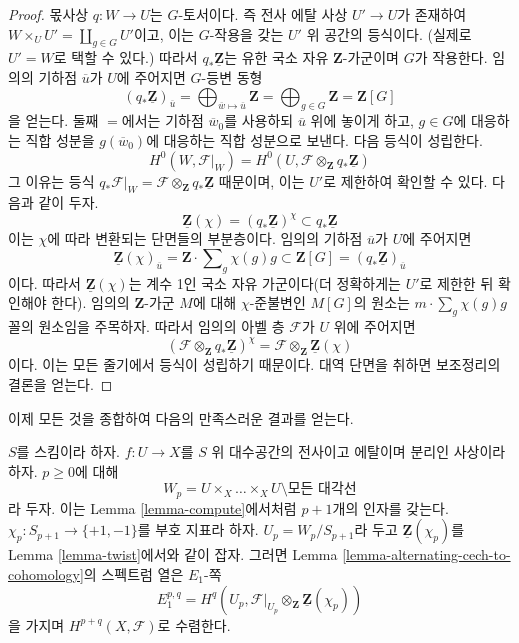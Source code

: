\begin{proof}
몫사상 $q : W \to U$는 $G$-토서이다. 즉 전사 에탈 사상
$U' \to U$가 존재하여 $W \times_U U' = \coprod_{g \in G} U'$이고,
이는 $G$-작용을 갖는 $U'$ 위 공간의 등식이다.
(실제로 $U' = W$로 택할 수 있다.) 따라서
$q_*\underline{\mathbf{Z}}$는 유한 국소 자유 $\mathbf{Z}$-가군이며
$G$가 작용한다. 임의의 기하점 $\overline{u}$가 $U$에 주어지면
$G$-등변 동형
$$
(q_*\underline{\mathbf{Z}})_{\overline{u}}
= \bigoplus\nolimits_{\overline{w} \mapsto \overline{u}} \mathbf{Z}
= \bigoplus\nolimits_{g \in G} \mathbf{Z} = \mathbf{Z}[G]
$$
을 얻는다. 둘째 $=$에서는 기하점 $\overline{w}_0$를 사용하되
$\overline{u}$ 위에 놓이게 하고, $g \in G$에 대응하는 직합 성분을
$g(\overline{w}_0)$에 대응하는 직합 성분으로 보낸다. 다음 등식이
성립한다.
$$
H^0(W, \mathcal{F}|_W) =
H^0(U, \mathcal{F} \otimes_\mathbf{Z} q_*\underline{\mathbf{Z}})
$$
그 이유는 등식 $q_*\mathcal{F}|_W =
\mathcal{F} \otimes_\mathbf{Z} q_*\underline{\mathbf{Z}}$ 때문이며,
이는 $U'$로 제한하여 확인할 수 있다.
다음과 같이 두자.
$$
\underline{\mathbf{Z}}(\chi) =
(q_*\underline{\mathbf{Z}})^\chi \subset
q_*\underline{\mathbf{Z}}
$$
이는 $\chi$에 따라 변환되는 단면들의 부분층이다. 임의의 기하점
$\overline{u}$가 $U$에 주어지면
$$
\underline{\mathbf{Z}}(\chi)_{\overline{u}} =
\mathbf{Z} \cdot \sum\nolimits_g \chi(g) g
\subset
\mathbf{Z}[G] = (q_*\underline{\mathbf{Z}})_{\overline{u}}
$$
이다. 따라서 $\underline{\mathbf{Z}}(\chi)$는 계수 1인 국소
자유 가군이다(더 정확하게는 $U'$로 제한한 뒤 확인해야 한다).
임의의 $\mathbf{Z}$-가군 $M$에 대해 $\chi$-준불변인 $M[G]$의 원소는
$m \cdot \sum\nolimits_g \chi(g) g$ 꼴의 원소임을 주목하자.
따라서 임의의 아벨 층 $\mathcal{F}$가 $U$ 위에 주어지면
$$
\left(\mathcal{F} \otimes_\mathbf{Z} q_*\underline{\mathbf{Z}}\right)^\chi
=
\mathcal{F} \otimes_\mathbf{Z} \underline{\mathbf{Z}}(\chi)
$$
이다. 이는 모든 줄기에서 등식이 성립하기 때문이다. 대역 단면을 취하면
보조정리의 결론을 얻는다.
\end{proof}

\noindent
이제 모든 것을 종합하여 다음의 만족스러운 결과를 얻는다.

\begin{lemma}
\label{lemma-alternating-spectral-sequence}
$S$를 스킴이라 하자. $f : U \to X$를 $S$ 위 대수공간의 전사이고
에탈이며 분리인 사상이라 하자. $p \geq 0$에 대해
$$
W_p = U \times_X \ldots \times_X U \setminus \text{모든 대각선}
$$
라 두자. 이는 Lemma \ref{lemma-compute}에서처럼 $p + 1$개의 인자를
갖는다. $\chi_p : S_{p + 1} \to \{+1, -1\}$를 부호 지표라 하자.
$U_p = W_p/S_{p + 1}$라 두고 $\underline{\mathbf{Z}}(\chi_p)$를
Lemma \ref{lemma-twist}에서와 같이 잡자. 그러면 Lemma
\ref{lemma-alternating-cech-to-cohomology}의 스펙트럼 열은 $E_1$-쪽
$$
E_1^{p, q} =
H^q(U_p, \mathcal{F}|_{U_p} \otimes_\mathbf{Z} \underline{\mathbf{Z}}(\chi_p))
$$
을 가지며 $H^{p + q}(X, \mathcal{F})$로 수렴한다.
\end{lemma}

